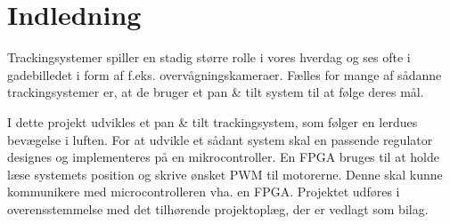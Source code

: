 \section*{Indledning}
Trackingsystemer spiller en stadig større rolle i vores hverdag og ses ofte i gadebilledet i form 
af f.eks. overvågningskameraer.
Fælles for mange af sådanne trackingsystemer er, at de bruger et pan \& tilt system til at følge deres mål. 

I dette projekt udvikles et pan \& tilt trackingsystem, som følger en lerdues bevægelse i 
luften. For at udvikle et sådant system skal en passende regulator designes og implementeres
på en mikrocontroller. 
En FPGA  bruges til at holde læse systemets position og skrive ønsket PWM til motorerne. 
Denne skal kunne kommunikere med microcontrolleren vha. en FPGA. 
Projektet udføres i overensstemmelse med det tilhørende projektoplæg, der er vedlagt 
som bilag.
